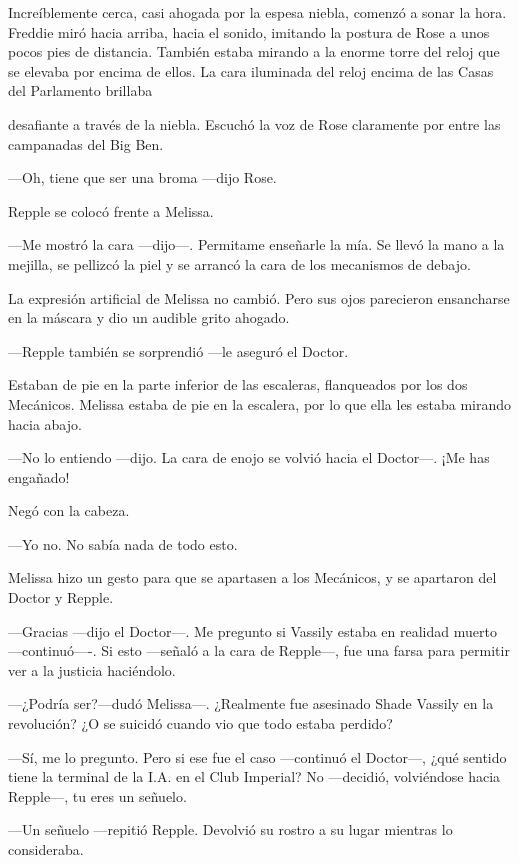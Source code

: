 {Increíblemente cerca, casi ahogada por la espesa niebla, comenzó a
	sonar la hora. Freddie miró hacia arriba, hacia el sonido, imitando la
	postura de Rose a unos pocos pies de distancia. También estaba mirando a
	la enorme torre del reloj que se elevaba por encima de ellos. La cara
iluminada del reloj encima de las Casas del Parlamento brillaba}

{desafiante a través de la niebla. Escuchó la voz de Rose claramente por
entre las campanadas del Big Ben.}

{---Oh, tiene que ser una broma ---dijo Rose.}

\mbox{}

{Repple se colocó frente a Melissa.}

{---Me mostró la cara ---dijo---. Permitame enseñarle la mía. Se llevó
	la mano a la mejilla, se pellizcó la piel y se arrancó la cara de los
mecanismos de debajo.}

{La expresión artificial de Melissa no cambió. Pero sus ojos parecieron
ensancharse en la máscara y dio un audible grito ahogado.}

{---Repple también se sorprendió ---le aseguró el Doctor.}

{Estaban de pie en la parte inferior de las escaleras, flanqueados por
	los dos Mecánicos. Melissa estaba de pie en la escalera, por lo que ella
les estaba mirando hacia abajo.}

{---No lo entiendo ---dijo. La cara de enojo se volvió hacia el
Doctor---. ¡Me has engañado!}

{Negó con la cabeza.}

{---Yo no. No sabía nada de todo esto.}

{Melissa hizo un gesto para que se apartasen a los Mecánicos, y se
apartaron del Doctor y Repple.}

{---Gracias ---dijo el Doctor---. Me pregunto si Vassily estaba en
	realidad muerto ---continuó----. Si esto ---señaló a la cara de
Repple---, fue una farsa para permitir ver a la justicia haciéndolo.}

{---¿Podría ser?---dudó Melissa---. ¿Realmente fue asesinado Shade
	Vassily en la revolución? ¿O se suicidó cuando vio que todo estaba
perdido?}

{---Sí, me lo pregunto. Pero si ese fue el caso ---continuó el
	Doctor---, ¿qué sentido tiene la terminal de la I.A. en el Club
	Imperial? No ---decidió, volviéndose hacia Repple---, tu eres un
señuelo.}

{---Un señuelo ---repitió Repple. Devolvió su rostro a su lugar mientras
lo consideraba.}

